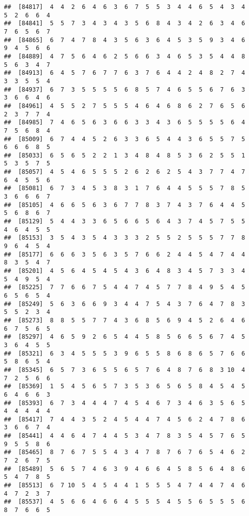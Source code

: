 \documentclass[
]{book}
\begin{document}
\begin{verbatim}
##  [84817]  4  4  2  6  4  6  3  6  7  5  5  3  4  4  6  5  4  3  4  5  2  6  6  4
##  [84841]  5  5  7  3  4  3  4  3  5  6  8  4  3  4  2  6  3  4  6  7  6  5  6  7
##  [84865]  6  7  4  7  8  4  3  5  6  3  6  4  5  3  5  9  3  4  6  9  4  5  6  6
##  [84889]  4  7  5  6  4  6  2  5  6  6  3  4  6  5  3  5  4  4  8  5  6  3  4  7
##  [84913]  6  4  5  7  6  7  7  6  3  7  6  4  4  2  4  8  2  7  4  3  3  5  5  4
##  [84937]  6  7  3  5  5  5  5  6  8  5  7  4  6  5  5  6  7  6  3  3  6  6  4  6
##  [84961]  4  5  5  2  7  5  5  5  4  6  4  6  8  6  2  7  6  5  6  2  3  7  7  4
##  [84985]  7  4  6  5  6  3  6  6  3  3  4  3  6  5  5  5  5  6  4  7  5  6  8  4
##  [85009]  6  7  4  4  5  2  6  3  3  6  5  4  4  3  6  5  5  7  5  6  6  6  8  5
##  [85033]  6  5  6  5  2  2  1  3  4  8  4  8  5  3  6  2  5  5  1  5  3  5  7  5
##  [85057]  4  5  4  6  5  5  5  2  6  2  6  2  5  4  3  7  7  4  7  6  4  5  5  6
##  [85081]  6  7  3  4  5  3  8  3  1  7  6  4  4  5  5  5  7  8  5  3  6  6  6  7
##  [85105]  4  6  6  5  6  3  6  7  7  8  3  7  4  3  7  6  4  4  5  5  6  8  6  7
##  [85129]  5  4  4  3  3  6  5  6  6  5  6  4  3  7  4  5  7  5  5  4  6  4  5  5
##  [85153]  3  5  4  3  5  4  3  3  3  2  5  5  2  5  5  5  7  7  8  9  6  4  5  4
##  [85177]  6  6  6  3  5  6  3  5  7  6  6  2  4  4  5  4  7  4  4  8  3  5  4  7
##  [85201]  4  5  6  4  5  4  5  4  3  6  4  8  3  4  5  7  3  3  4  5  4  9  5  4
##  [85225]  7  7  6  6  7  5  4  4  7  4  5  7  7  8  4  9  5  4  5  6  5  6  5  4
##  [85249]  5  6  3  6  6  9  3  4  4  7  5  4  3  7  6  4  7  8  3  5  5  2  3  4
##  [85273]  8  8  5  5  7  7  4  3  6  8  5  6  9  4  5  2  6  4  6  6  7  5  6  5
##  [85297]  4  6  5  9  2  6  5  4  4  5  8  5  6  6  5  6  7  4  5  3  6  4  5  5
##  [85321]  6  3  4  5  5  5  3  9  6  5  5  8  6  8  6  5  7  6  6  5  8  6  5  4
##  [85345]  6  5  7  3  6  5  5  6  5  7  6  4  8  7  6  8  3 10  4  7  2  5  6  6
##  [85369]  1  5  4  5  6  5  7  3  5  3  6  5  6  5  8  4  5  4  5  6  4  6  6  3
##  [85393]  6  7  3  4  4  4  7  4  5  4  6  7  3  4  6  3  5  6  5  4  4  4  4  4
##  [85417]  7  4  4  3  5  2  4  5  4  4  7  4  5  6  2  4  7  8  6  3  6  6  7  4
##  [85441]  4  4  6  4  7  4  4  5  3  4  7  8  3  5  4  5  7  6  5  9  5  5  8  6
##  [85465]  8  7  6  7  5  5  4  3  4  7  8  7  6  7  6  5  4  6  2  7  2  6  7  5
##  [85489]  5  6  5  7  4  6  3  9  4  6  6  4  5  8  5  6  4  8  6  5  4  7  8  5
##  [85513]  6  7 10  5  4  5  4  4  1  5  5  5  4  7  4  4  7  4  6  4  7  2  3  7
##  [85537]  4  5  6  6  4  6  6  4  5  5  5  4  5  5  6  5  5  5  6  8  7  6  6  5

\end{verbatim}
\end{document}
